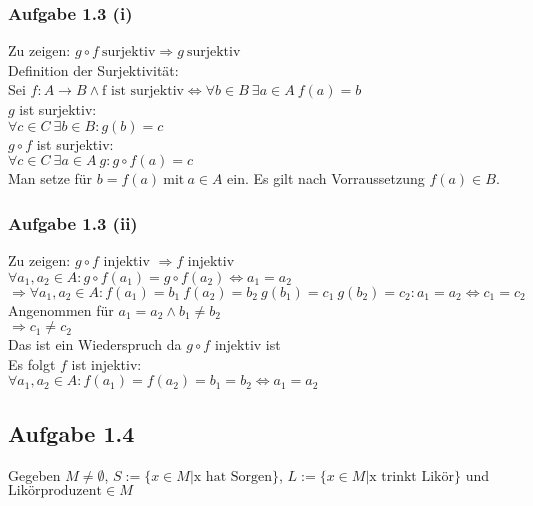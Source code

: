 \documentclass{article}
\begin{document}
            \subsubsection*{Aufgabe 1.3 (i)}
                Zu zeigen: \(g \circ f \: \text{surjektiv} \Rightarrow g \: \text{surjektiv}\)\\
                Definition der Surjektivität: \\
                Sei \(f: A \rightarrow B \land \text{f ist surjektiv} \Leftrightarrow \forall b \in B \: \exists a \in A \: f(a) = b\) \\
                \(g\) ist surjektiv: \\
                \(\forall c \in C \: \exists b \in B: g(b) = c\) \\
                \(g \circ f\) ist surjektiv: \\
                \(\forall c \in C \: \exists a \in A \: g : g \circ f(a) = c\) \\
                Man setze für \(b = f(a) \: \text{mit} \: a \in A \) ein.
                Es gilt nach Vorraussetzung \(f(a) \in B\).
            
            \subsubsection*{Aufgabe 1.3 (ii)}
                Zu zeigen: \(g \circ f\) injektiv \(\Rightarrow f\) injektiv \\
                \(\forall a_1, a_2 \in A: g \circ f(a_1) = g \circ f(a_2) \Leftrightarrow a_1 = a_2\) \\
                \(\Rightarrow \forall a_1, a_2 \in A: f(a_1) = b_1 \: f(a_2) = b_2 \: g(b_1) = c_1 \: g(b_2) = c_2: a_1 = a_2 \Leftrightarrow c_1 = c_2\) \\
                Angenommen für \(a_1 = a_2 \land b_1 \neq b_2\) \\
                \(\Rightarrow c_1 \neq c_2\) \\
                Das ist ein Wiederspruch da \(g \circ f\) injektiv ist \\
                Es folgt \(f\) ist injektiv: \\
                \(\forall a_1, a_2 \in A: f(a_1) = f(a_2) = b_1 = b_2 \Leftrightarrow a_1 = a_2 \) \\

        \subsection*{Aufgabe 1.4}
            Gegeben \(M \not= \emptyset \), \(S:=\{x \in M | \text{x hat Sorgen}\} \), \(L:=\{x \in M | \text{x trinkt Likör}\} \) und \(\text{Likörproduzent} \in M\)
\end{document}

